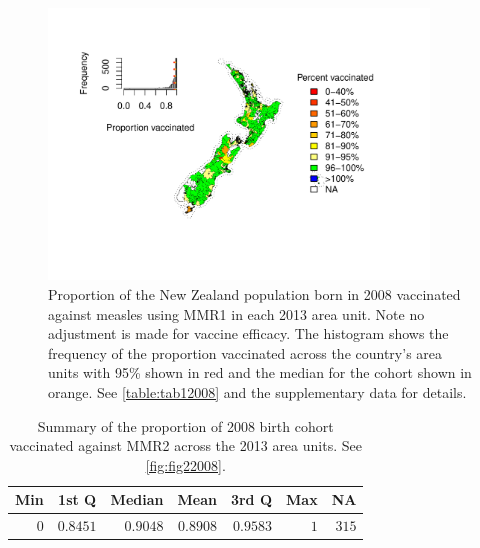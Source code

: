 \documentclass{article}
\begin{document}
\begin{figure}
\begin{center}
    \includegraphics[width=0.9\textwidth]{nir_census_MMR1_NIR_2008.pdf}
\end{center}
    \caption{Proportion of the New Zealand population born in 2008 vaccinated against measles using MMR1 in each 2013 area unit. Note no adjustment is made for vaccine efficacy. The histogram shows the frequency of the proportion vaccinated across the country's area units with 95\% shown in red and the median for the cohort shown in orange. See \autoref{table:tab12008} and the supplementary data for details.}
\label{fig:fig12008}
\end{figure}

 \vspace{5mm} %
\begin{table}
\begin{center}
\begin{tabular}{rrrrrrr}
\hline\hline
\multicolumn{1}{c}{Min}&\multicolumn{1}{c}{1st Q}&\multicolumn{1}{c}{Median}&\multicolumn{1}{c}{Mean}&\multicolumn{1}{c}{3rd Q}&\multicolumn{1}{c}{Max}&\multicolumn{1}{c}{NA}\tabularnewline
\hline
$0$&$0.8451$&$0.9048$&$0.8908$&$0.9583$&$1$&$315$\tabularnewline
\hline
\end{tabular}\end{center}\caption{Summary of the proportion of 2008 birth cohort vaccinated against MMR2 across the 2013 area units. See \autoref{fig:fig22008}.}
\label{table:tab22008}
\end{table}
\end{document}
